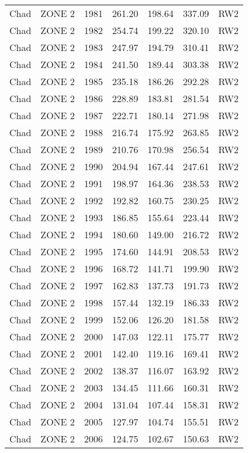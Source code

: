 \begin{longtable}{lllrrrl}
  Chad & ZONE 2 & 1981 & 261.20 & 198.64 & 337.09 & RW2 \\ 
  Chad & ZONE 2 & 1982 & 254.74 & 199.22 & 320.10 & RW2 \\ 
  Chad & ZONE 2 & 1983 & 247.97 & 194.79 & 310.41 & RW2 \\ 
  Chad & ZONE 2 & 1984 & 241.50 & 189.44 & 303.38 & RW2 \\ 
  Chad & ZONE 2 & 1985 & 235.18 & 186.26 & 292.28 & RW2 \\ 
  Chad & ZONE 2 & 1986 & 228.89 & 183.81 & 281.54 & RW2 \\ 
  Chad & ZONE 2 & 1987 & 222.71 & 180.14 & 271.98 & RW2 \\ 
  Chad & ZONE 2 & 1988 & 216.74 & 175.92 & 263.85 & RW2 \\ 
  Chad & ZONE 2 & 1989 & 210.76 & 170.98 & 256.54 & RW2 \\ 
  Chad & ZONE 2 & 1990 & 204.94 & 167.44 & 247.61 & RW2 \\ 
  Chad & ZONE 2 & 1991 & 198.97 & 164.36 & 238.53 & RW2 \\ 
  Chad & ZONE 2 & 1992 & 192.82 & 160.75 & 230.25 & RW2 \\ 
  Chad & ZONE 2 & 1993 & 186.85 & 155.64 & 223.44 & RW2 \\ 
  Chad & ZONE 2 & 1994 & 180.60 & 149.00 & 216.72 & RW2 \\ 
  Chad & ZONE 2 & 1995 & 174.60 & 144.91 & 208.53 & RW2 \\ 
  Chad & ZONE 2 & 1996 & 168.72 & 141.71 & 199.90 & RW2 \\ 
  Chad & ZONE 2 & 1997 & 162.83 & 137.73 & 191.73 & RW2 \\ 
  Chad & ZONE 2 & 1998 & 157.44 & 132.19 & 186.33 & RW2 \\ 
  Chad & ZONE 2 & 1999 & 152.06 & 126.20 & 181.58 & RW2 \\ 
  Chad & ZONE 2 & 2000 & 147.03 & 122.11 & 175.77 & RW2 \\ 
  Chad & ZONE 2 & 2001 & 142.40 & 119.16 & 169.41 & RW2 \\ 
  Chad & ZONE 2 & 2002 & 138.37 & 116.07 & 163.92 & RW2 \\ 
  Chad & ZONE 2 & 2003 & 134.45 & 111.66 & 160.31 & RW2 \\ 
  Chad & ZONE 2 & 2004 & 131.04 & 107.44 & 158.31 & RW2 \\ 
  Chad & ZONE 2 & 2005 & 127.97 & 104.74 & 155.51 & RW2 \\ 
  Chad & ZONE 2 & 2006 & 124.75 & 102.67 & 150.63 & RW2 \\ 

\end{longtable}
